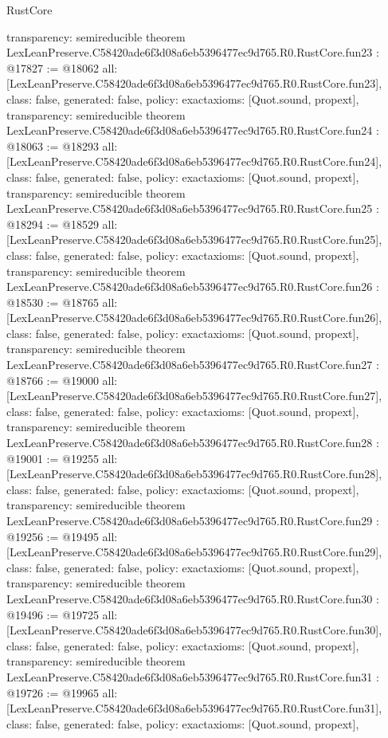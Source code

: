 \begin{lexlean}{RustCore}
\begin{coremodule}
{  transparency: semireducible
}
theorem LexLeanPreserve.C58420ade6f3d08a6eb5396477ec9d765.R0.RustCore.fun23 : @17827 := @18062 {
  all: [LexLeanPreserve.C58420ade6f3d08a6eb5396477ec9d765.R0.RustCore.fun23],
  class: false,
  generated: false,
  policy: exact{axioms: [Quot.sound, propext]},
  transparency: semireducible
}
theorem LexLeanPreserve.C58420ade6f3d08a6eb5396477ec9d765.R0.RustCore.fun24 : @18063 := @18293 {
  all: [LexLeanPreserve.C58420ade6f3d08a6eb5396477ec9d765.R0.RustCore.fun24],
  class: false,
  generated: false,
  policy: exact{axioms: [Quot.sound, propext]},
  transparency: semireducible
}
theorem LexLeanPreserve.C58420ade6f3d08a6eb5396477ec9d765.R0.RustCore.fun25 : @18294 := @18529 {
  all: [LexLeanPreserve.C58420ade6f3d08a6eb5396477ec9d765.R0.RustCore.fun25],
  class: false,
  generated: false,
  policy: exact{axioms: [Quot.sound, propext]},
  transparency: semireducible
}
theorem LexLeanPreserve.C58420ade6f3d08a6eb5396477ec9d765.R0.RustCore.fun26 : @18530 := @18765 {
  all: [LexLeanPreserve.C58420ade6f3d08a6eb5396477ec9d765.R0.RustCore.fun26],
  class: false,
  generated: false,
  policy: exact{axioms: [Quot.sound, propext]},
  transparency: semireducible
}
theorem LexLeanPreserve.C58420ade6f3d08a6eb5396477ec9d765.R0.RustCore.fun27 : @18766 := @19000 {
  all: [LexLeanPreserve.C58420ade6f3d08a6eb5396477ec9d765.R0.RustCore.fun27],
  class: false,
  generated: false,
  policy: exact{axioms: [Quot.sound, propext]},
  transparency: semireducible
}
theorem LexLeanPreserve.C58420ade6f3d08a6eb5396477ec9d765.R0.RustCore.fun28 : @19001 := @19255 {
  all: [LexLeanPreserve.C58420ade6f3d08a6eb5396477ec9d765.R0.RustCore.fun28],
  class: false,
  generated: false,
  policy: exact{axioms: [Quot.sound, propext]},
  transparency: semireducible
}
theorem LexLeanPreserve.C58420ade6f3d08a6eb5396477ec9d765.R0.RustCore.fun29 : @19256 := @19495 {
  all: [LexLeanPreserve.C58420ade6f3d08a6eb5396477ec9d765.R0.RustCore.fun29],
  class: false,
  generated: false,
  policy: exact{axioms: [Quot.sound, propext]},
  transparency: semireducible
}
theorem LexLeanPreserve.C58420ade6f3d08a6eb5396477ec9d765.R0.RustCore.fun30 : @19496 := @19725 {
  all: [LexLeanPreserve.C58420ade6f3d08a6eb5396477ec9d765.R0.RustCore.fun30],
  class: false,
  generated: false,
  policy: exact{axioms: [Quot.sound, propext]},
  transparency: semireducible
}
theorem LexLeanPreserve.C58420ade6f3d08a6eb5396477ec9d765.R0.RustCore.fun31 : @19726 := @19965 {
  all: [LexLeanPreserve.C58420ade6f3d08a6eb5396477ec9d765.R0.RustCore.fun31],
  class: false,
  generated: false,
  policy: exact{axioms: [Quot.sound, propext]},
}
\end{coremodule}
\end{lexlean}
